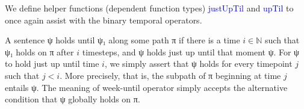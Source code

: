 \documentclass[a4paper, 11pt]{article}
\newcommand{\blue}[1]{\textcolor{blue}{#1}}
\begin{document}
We define helper functions (dependent function types) \blue{justUpTil} and
\blue{upTil} to once again assist with the binary temporal operators.

A sentence ψ holds until ψ₁ along some path π if there is a time $i\in\mathbb{N}$ such that
ψ₁ holds on π after $i$ timesteps, and ψ holds just up until that moment ψ. For ψ
to hold just up until time $i$, we simply assert that ψ holds for every timepoint $j$ such that
$j<i$. More precisely, that is, the subpath of π beginning at time $j$ entails ψ. The meaning
of week-until operator simply accepts the alternative condition that ψ globally
holds on π.

\begin{code}%
%
\>[4]\AgdaSpace{}%
\AgdaSymbol{:}\AgdaSpace{}%
\AgdaSpace{}%
\AgdaSpace{}%
\AgdaSpace{}%
\AgdaSpace{}%
\AgdaSpace{}%
\AgdaSpace{}%
\<%
\\
%
\>[4]\AgdaSpace{}%
\AgdaSpace{}%
\AgdaSpace{}%
\AgdaSpace{}%
\AgdaSymbol{=}\AgdaSpace{}%
\AgdaSpace{}%
\AgdaSymbol{(}\AgdaSpace{}%
\AgdaSymbol{:}\AgdaSpace{}%
\AgdaSymbol{)}\AgdaSpace{}%
\AgdaSpace{}%
\AgdaSpace{}%
\AgdaSpace{}%
\AgdaSpace{}%
\AgdaSpace{}%
\AgdaSymbol{(}\AgdaSpace{}%
\AgdaSpace{}%
\AgdaSymbol{)}\AgdaSpace{}%
\AgdaSpace{}%
\<%
\\
%
\\[\AgdaEmptyExtraSkip]%
%
\>[4]\AgdaSpace{}%
\AgdaSymbol{:}\AgdaSpace{}%
\AgdaSpace{}%
\AgdaSpace{}%
\AgdaSpace{}%
\AgdaSpace{}%
\AgdaSpace{}%
\AgdaSpace{}%
\<%
\\
%
\>[4]\AgdaSpace{}%
\AgdaSpace{}%
\AgdaSpace{}%
\AgdaSpace{}%
\AgdaSymbol{=}\AgdaSpace{}%
\AgdaFunction{Σ[}\AgdaSpace{}%
\AgdaSpace{}%
\AgdaSpace{}%
\AgdaSpace{}%
\AgdaFunction{]}\AgdaSpace{}%
\AgdaSymbol{(}\AgdaSpace{}%
\AgdaSpace{}%
\AgdaSymbol{)}\AgdaSpace{}%
\AgdaSpace{}%
\AgdaSpace{}%
\AgdaSpace{}%
\AgdaSpace{}%
\AgdaSpace{}%
\AgdaSpace{}%
\<%
\end{code}
\end{document}
